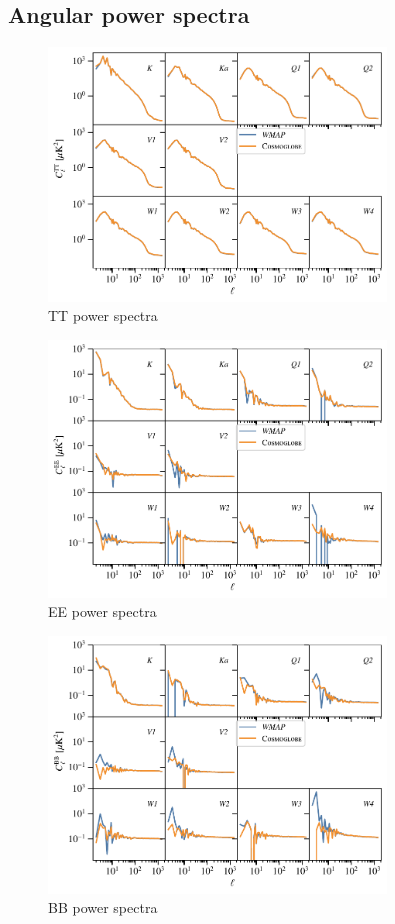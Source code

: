 \documentclass[twocolumn]{../../common/aa}
\begin{document}
\subsection{Angular power spectra}

\begin{figure}
	\centering
	\includegraphics[width=0.8\textwidth]{figures/TT_spectra.pdf}
	\caption{TT power spectra}
\end{figure}
\begin{figure}
	\centering
	\includegraphics[width=0.8\textwidth]{figures/EE_spectra.pdf}
	\caption{EE power spectra}
\end{figure}
\begin{figure}
	\centering
	\includegraphics[width=0.8\textwidth]{figures/BB_spectra.pdf}
	\caption{BB power spectra}
\end{figure}
\end{document}
